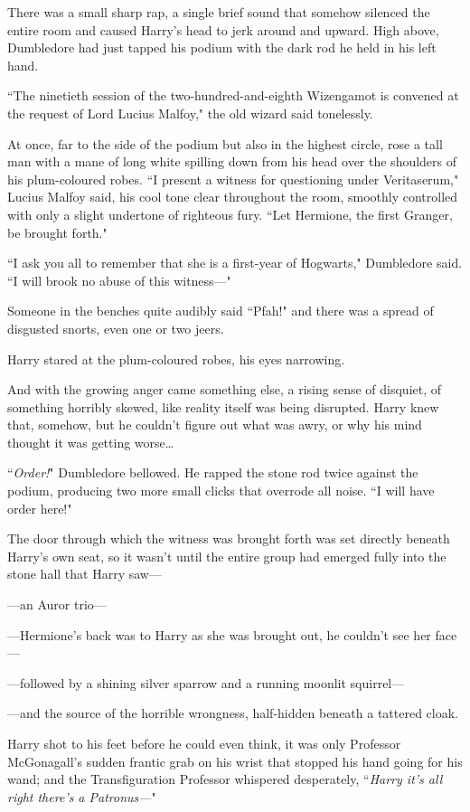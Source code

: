 There was a small sharp rap, a single brief sound that somehow silenced the entire room and caused Harry's head to jerk around and upward. High above, Dumbledore had just tapped his podium with the dark rod he held in his left hand.

``The ninetieth session of the two-hundred-and-eighth Wizengamot is convened at the request of Lord Lucius Malfoy," the old wizard said tonelessly.

At once, far to the side of the podium but also in the highest circle, rose a tall man with a mane of long white spilling down from his head over the shoulders of his plum-coloured robes. ``I present a witness for questioning under Veritaserum," Lucius Malfoy said, his cool tone clear throughout the room, smoothly controlled with only a slight undertone of righteous fury. ``Let Hermione, the first Granger, be brought forth."

``I ask you all to remember that she is a first-year of Hogwarts," Dumbledore said. ``I will brook no abuse of this witness—"

Someone in the benches quite audibly said ``Pfah!" and there was a spread of disgusted snorts, even one or two jeers.

Harry stared at the plum-coloured robes, his eyes narrowing.

And with the growing anger came something else, a rising sense of disquiet, of something horribly skewed, like reality itself was being disrupted. Harry knew that, somehow, but he couldn't figure out what was awry, or why his mind thought it was getting worse{\ldots}

``\emph{Order!}" Dumbledore bellowed. He rapped the stone rod twice against the podium, producing two more small clicks that overrode all noise. ``I will have order here!"

The door through which the witness was brought forth was set directly beneath Harry's own seat, so it wasn't until the entire group had emerged fully into the stone hall that Harry saw—

—an Auror trio—

—Hermione's back was to Harry as she was brought out, he couldn't see her face—

—followed by a shining silver sparrow and a running moonlit squirrel—

—and the source of the horrible wrongness, half-hidden beneath a tattered cloak.

Harry shot to his feet before he could even think, it was only Professor McGonagall's sudden frantic grab on his wrist that stopped his hand going for his wand; and the Transfiguration Professor whispered desperately, ``\emph{Harry it's all right there's a Patronus—}"

